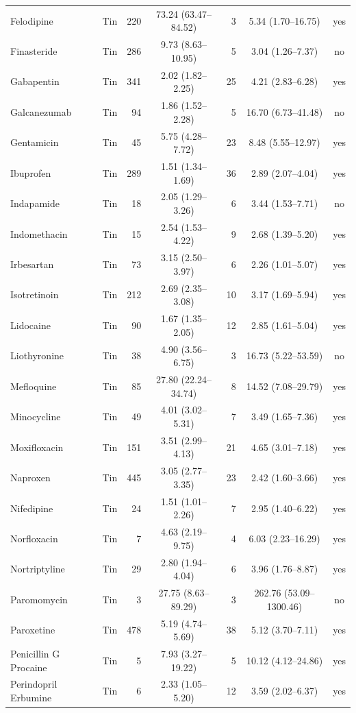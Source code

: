 \documentclass[10pt]{article}
\begin{document}
{\begin{longtable}{lcrcrcc}
Felodipine & Tin & 220 & 73.24 (63.47--84.52) & 3 & 5.34 (1.70--16.75) & yes \\
Finasteride & Tin & 286 & 9.73 (8.63--10.95) & 5 & 3.04 (1.26--7.37) & no \\
Gabapentin & Tin & 341 & 2.02 (1.82--2.25) & 25 & 4.21 (2.83--6.28) & yes \\
Galcanezumab & Tin & 94 & 1.86 (1.52--2.28) & 5 & 16.70 (6.73--41.48) & no \\
Gentamicin & Tin & 45 & 5.75 (4.28--7.72) & 23 & 8.48 (5.55--12.97) & yes \\
Ibuprofen & Tin & 289 & 1.51 (1.34--1.69) & 36 & 2.89 (2.07--4.04) & yes \\
Indapamide & Tin & 18 & 2.05 (1.29--3.26) & 6 & 3.44 (1.53--7.71) & no \\
Indomethacin & Tin & 15 & 2.54 (1.53--4.22) & 9 & 2.68 (1.39--5.20) & yes \\
Irbesartan & Tin & 73 & 3.15 (2.50--3.97) & 6 & 2.26 (1.01--5.07) & yes \\
Isotretinoin & Tin & 212 & 2.69 (2.35--3.08) & 10 & 3.17 (1.69--5.94) & yes \\
Lidocaine & Tin & 90 & 1.67 (1.35--2.05) & 12 & 2.85 (1.61--5.04) & yes \\
Liothyronine & Tin & 38 & 4.90 (3.56--6.75) & 3 & 16.73 (5.22--53.59) & no \\
Mefloquine & Tin & 85 & 27.80 (22.24--34.74) & 8 & 14.52 (7.08--29.79) & yes \\
Minocycline & Tin & 49 & 4.01 (3.02--5.31) & 7 & 3.49 (1.65--7.36) & yes \\
Moxifloxacin & Tin & 151 & 3.51 (2.99--4.13) & 21 & 4.65 (3.01--7.18) & yes \\
Naproxen & Tin & 445 & 3.05 (2.77--3.35) & 23 & 2.42 (1.60--3.66) & yes \\
Nifedipine & Tin & 24 & 1.51 (1.01--2.26) & 7 & 2.95 (1.40--6.22) & yes \\
Norfloxacin & Tin & 7 & 4.63 (2.19--9.75) & 4 & 6.03 (2.23--16.29) & yes \\
Nortriptyline & Tin & 29 & 2.80 (1.94--4.04) & 6 & 3.96 (1.76--8.87) & yes \\
Paromomycin & Tin & 3 & 27.75 (8.63--89.29) & 3 & 262.76 (53.09--1300.46) & no \\
Paroxetine & Tin & 478 & 5.19 (4.74--5.69) & 38 & 5.12 (3.70--7.11) & yes \\
Penicillin G Procaine & Tin & 5 & 7.93 (3.27--19.22) & 5 & 10.12 (4.12--24.86) & yes \\
Perindopril Erbumine & Tin & 6 & 2.33 (1.05--5.20) & 12 & 3.59 (2.02--6.37) & yes \\

\end{longtable}}
\end{document}

